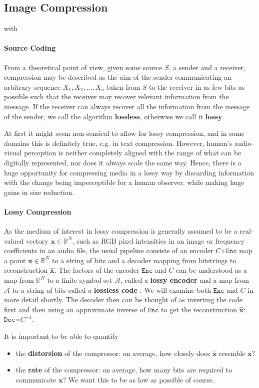 \documentclass{article}
\renewcommand{\vec}[1]{\mathbf{#1}}
\newcommand{\A}{\mathcal{A}}
\newcommand{\Enc}{\mathtt{Enc}}
\newcommand{\Dec}{\mathtt{Dec}}
\newcommand{\Reals}{\mathbb{R}}
\begin{document}
\subsection{Image Compression}
\par
with 
\paragraph{Source Coding}
From a theoretical point of view, given some source $S$, a sender and a
receiver, compression may be described as the aim of the sender communicating an
arbitrary sequence $X_1, X_2, \hdots, X_n$ taken from $S$ to the receiver in as few bits
as possible such that the receiver may recover relevant information from the message.
If the receiver can always recover all the information from the message of the sender, we
call the algorithm \textbf{lossless}, otherwise we call it \textbf{lossy}. 
\par
At first it might seem non-sensical to allow for lossy compression, and in some
domains this is definitely true, e.g. in text compression. However, 
human's audio-visual perception is neither completely aligned with the range of
what can be digitally represented, nor does it always scale the same way. Hence,
there is a huge opportunity for compressing media in a lossy way by discarding
information with the change being imperceptible for a human observer, while
making huge gains in size reduction.
\paragraph{Lossy Compression}
As the medium of interest in lossy compression is generally assumed to be a
real-valued vectory $\vec{x} \in \Reals^N$, such as RGB pixel intensities in an
image or frequency coefficients in an audio file, the usual pipeline consists of 
an encoder $C \circ \Enc$ map a point $\vec{x} \in \Reals^N$ to a string of bits and a
decoder mapping from bitstrings to reconstruction $\vec{\hat{x}}$. The
factors of the encoder $\Enc$ and $C$ can be understood as a map from $\Reals^N$ to a
finite symbol set $\A$, called a \textbf{lossy encoder} and a map from $\A$ to a
string of bits called a \textbf{lossless code} \cite{goyal2001theoretical}.
We will examine both $\Enc$ and $C$ in more detail shortly. The decoder then can be
thought of as inverting the code first and then using an approximate inverse of
$\Enc$ to get the reconstruction $\vec{\hat{x}}$: $\Dec \circ C^{-1}$.
\par
It is important to be able to quantify
\begin{itemize}
\item the \textbf{distorsion} of the compressor: on average, how closely does
  $\vec{\hat{x}}$ resemble $\vec{x}$?
\item the \textbf{rate} of the compressor: on average, how many bits are
  required to communicate $\vec{x}$? We want this to be as low as possible of course.
\end{itemize}
\end{document}
